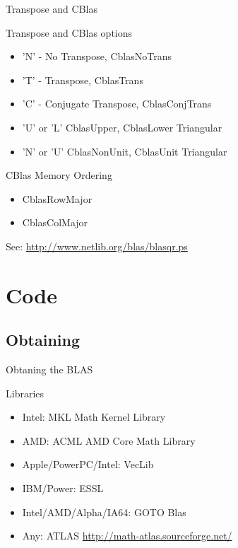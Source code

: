 \documentclass[handout]{beamer}
\begin{document}
\begin{frame}{Transpose and CBlas}
 \begin{block}{Transpose and CBlas options}
  \begin{itemize}
   \item 'N' - No Transpose, CblasNoTrans
   \item 'T' - Transpose, CblasTrans
   \item 'C' - Conjugate Transpose, CblasConjTrans
   \item 'U' or 'L' CblasUpper, CblasLower Triangular
   \item 'N' or 'U' CblasNonUnit, CblasUnit Triangular
  \end{itemize}
 \end{block}
 \begin{block}{CBlas Memory Ordering}
  \begin{itemize}
   \item CblasRowMajor
   \item CblasColMajor
  \end{itemize}
 \end{block}
 See: \url{http://www.netlib.org/blas/blasqr.ps}
\end{frame}

\section{Code}
\subsection{Obtaining}
\begin{frame}{Obtaning the BLAS}
\begin{block}{Libraries}
 \begin{itemize}
  \item Intel:  MKL Math Kernel Library 
  \item AMD: ACML AMD Core Math Library
  \item Apple/PowerPC/Intel: VecLib
  \item IBM/Power: ESSL
  \item Intel/AMD/Alpha/IA64: GOTO Blas
  \item Any: ATLAS \url{http://math-atlas.sourceforge.net/}
 \end{itemize}
\end{block}
\end{frame}
\end{document}
